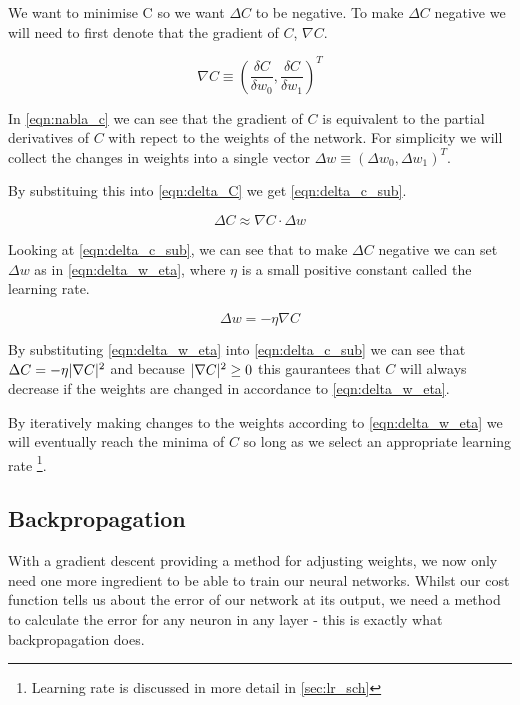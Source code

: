 We want to minimise C so we want $\Delta C$ to be negative. To make $\Delta C$ negative we will need to first denote that the gradient of $C$, $\nabla C$. 

\begin{equation}
\nabla C \equiv (\frac{\delta C}{\delta w_0}, \frac{\delta C}{\delta w_1})^T
\label{eqn:nabla_c}
\end{equation}

In \autoref{eqn:nabla_c} we can see that the gradient of $C$ is equivalent to the partial derivatives of $C$ with repect to the weights of the network. For simplicity we will collect the changes in weights into a single vector $\Delta w \equiv (\Delta w_0, \Delta w_1)^T$.

By substituing this into \autoref{eqn:delta_C} we get \autoref{eqn:delta_c_sub}.

\begin{equation}
\Delta C \approx \nabla C \cdot \Delta w 
\label{eqn:delta_c_sub}
\end{equation}

Looking at \autoref{eqn:delta_c_sub}, we can see that to make $\Delta C$ negative we can set $\Delta w$ as in \autoref{eqn:delta_w_eta}, where $\eta$ is a small positive constant called the learning rate.

\begin{equation}
\Delta w = -\eta \nabla C
\label{eqn:delta_w_eta}
\end{equation}

By substituting \autoref{eqn:delta_w_eta} into \autoref{eqn:delta_c_sub} we can see that $ \Delta C = - \eta \lvert\nabla C\rvert^2$ and because
 $\lvert\nabla C\rvert^2 \geq 0$ this gaurantees that $C$ will always decrease if the weights are changed in accordance to \autoref{eqn:delta_w_eta}.

By iteratively making changes to the weights according to \autoref{eqn:delta_w_eta} we will eventually reach the minima of $C$ so long as we select an appropriate learning rate \footnote{Learning rate is discussed in more detail in \autoref{sec:lr_sch}}. 

\subsection{Backpropagation}
With a gradient descent providing a method for adjusting  weights, we now only need one more ingredient to be able to train our neural networks. Whilst our cost function tells us about the error of our network at its output, we need a method to calculate the error for any neuron in any layer - this is exactly what backpropagation does.

